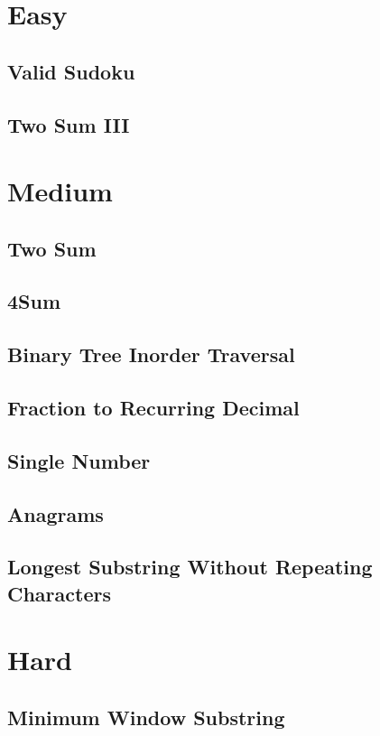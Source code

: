 \documentclass[12pt]{book}
\begin{document}
\section{Easy}
\label{sec-6-1}
\subsection{Valid Sudoku}
\label{sec-6-1-1}
\subsection{Two Sum III}
\label{sec-6-1-2}
\section{Medium}
\label{sec-6-2}
\subsection{Two Sum}
\label{sec-6-2-1}
\subsection{4Sum}
\label{sec-6-2-2}
\subsection{Binary Tree Inorder Traversal}
\label{sec-6-2-3}
\subsection{Fraction to Recurring Decimal}
\label{sec-6-2-4}
\subsection{Single Number}
\label{sec-6-2-5}
\subsection{Anagrams}
\label{sec-6-2-6}
\subsection{Longest Substring Without Repeating Characters}
\label{sec-6-2-7}
\section{Hard}
\label{sec-6-3}
\subsection{Minimum Window Substring}
\label{sec-6-3-1}
\end{document}
